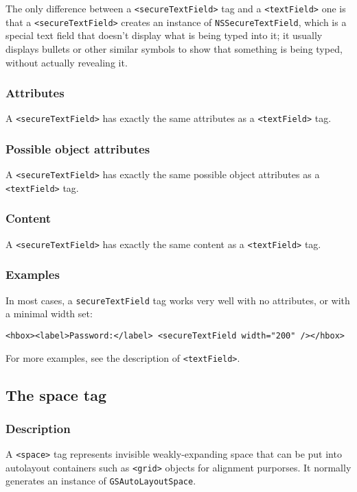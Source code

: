The only difference between a \texttt{<secureTextField>} tag and a
\texttt{<textField>} one is that a \texttt{<secureTextField>} creates
an instance of \texttt{NSSecureTextField}, which is a special text
field that doesn't display what is being typed into it; it usually
displays bullets or other similar symbols to show that something is
being typed, without actually revealing it.

\subsubsection{Attributes}
A \texttt{<secureTextField>} has exactly the same attributes as a
\texttt{<textField>} tag.

\subsubsection{Possible object attributes}
A \texttt{<secureTextField>} has exactly the same possible object
attributes as a \texttt{<textField>} tag.

\subsubsection{Content}
A \texttt{<secureTextField>} has exactly the same content as a
\texttt{<textField>} tag.

\subsubsection{Examples}
In most cases, a \texttt{secureTextField} tag works very well with no
attributes, or with a minimal width set:
\begin{verbatim}
<hbox><label>Password:</label> <secureTextField width="200" /></hbox>
\end{verbatim}
For more examples, see the description of \texttt{<textField>}.

\subsection{The space tag}

\subsubsection{Description}

A \texttt{<space>} tag represents invisible weakly-expanding space
that can be put into autolayout containers such as \texttt{<grid>}
objects for alignment purporses.  It normally generates an instance of
\texttt{GSAutoLayoutSpace}.

